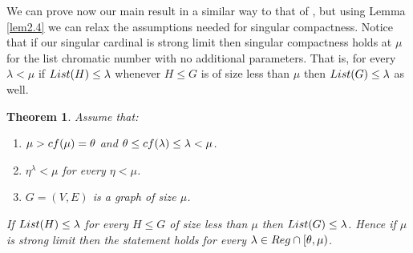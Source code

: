 \documentclass[11pt]{amsart}
\newtheorem{theorem}{Theorem}
\theoremstyle{definition}
\theoremstyle{remark}
\newcommand{\cf}{{\rm cf}}
\begin{document}
We can prove now our main result in a similar way to that of \cite[Proposition 3.6]{MR4732367}, but using Lemma \ref{lem2.4} we can relax the assumptions needed for singular compactness.
Notice that if our singular cardinal is strong limit then singular compactness holds at $\mu$ for the list chromatic number with no additional parameters.
That is, for every $\lambda<\mu$ if ${\rm List}(H)\leq\lambda$ whenever $H\leq G$ is of size less than $\mu$ then ${\rm List}(G)\leq\lambda$ as well.

\begin{theorem}
\label{thmmt} Assume that:
\begin{enumerate}
\item [$(a)$] $\mu>\cf(\mu)=\theta$ and $\theta\leq\cf(\lambda)\leq\lambda<\mu$.
\item [$(b)$] $\eta^\lambda<\mu$ for every $\eta<\mu$.
\item [$(c)$] $G=(V,E)$ is a graph of size $\mu$.
\end{enumerate}
If ${\rm List}(H)\leq\lambda$ for every $H\leq G$ of size less than $\mu$ then ${\rm List}(G)\leq\lambda$.
Hence if $\mu$ is strong limit then the statement holds for every $\lambda\in{\rm Reg}\cap[\theta,\mu)$.
\end{theorem}
\end{document}

